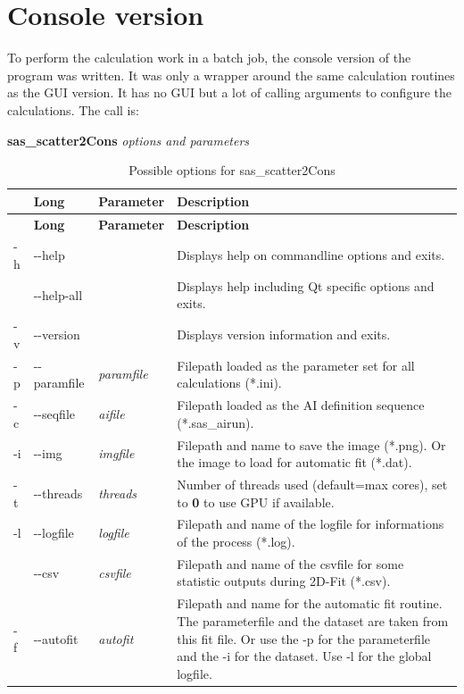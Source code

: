 \documentclass[11pt]{article} %
\begin{document}
\clearpage
\section{Console version}

To perform the calculation work in a batch job, the console version of the program was written. It was only a wrapper around the same calculation routines as the GUI version. It has no GUI but a lot of calling arguments to configure the calculations. The call is: \\
\centerline{{\bf sas\_scatter2Cons} {\it options and parameters}}

\begin{longtable}{|L{1cm}|L{2cm}|C{2cm}|L{12cm}|}
\caption{Possible options for sas\_scatter2Cons} \\
\hline{} & {\bf Long} & {\bf Parameter} & {\bf Description} \\
\endfirsthead
\hline{} & {\bf Long} & {\bf Parameter} & {\bf Description} \\
\endhead
\hline
-h & -{}-help & & Displays help on commandline options and exits. \\ \hline
 & -{}-help-all & & Displays help including Qt specific options and exits. \\ \hline
-v & -{}-version & & Displays version information and exits. \\ \hline
-p & -{}-paramfile & {\it paramfile} & Filepath loaded as the parameter set for all calculations (*.ini). \\ \hline
-c & -{}-seqfile & {\it aifile} & Filepath loaded as the AI definition sequence (*.sas\_airun). \\ \hline
-i & -{}-img & {\it imgfile} & Filepath and name to save the image (*.png). Or the image to load for automatic fit (*.dat). \\ \hline
-t & -{}-threads & {\it threads} & Number of threads used (default=max cores), set to {\bf 0} to use GPU if available. \\ \hline
-l & -{}-logfile & {\it logfile} & Filepath and name of the logfile for informations of the process (*.log). \\ \hline
 & -{}-csv & {\it csvfile} & Filepath and name of the csvfile for some statistic outputs during 2D-Fit (*.csv). \\ \hline
-f & -{}-autofit & {\it autofit} & Filepath and name for the automatic fit routine. The parameterfile and the dataset are taken from this fit file. Or use the -p for the parameterfile and the -i for the dataset. Use -l for the global logfile. \\ \hline

\end{longtable}
\end{document}
